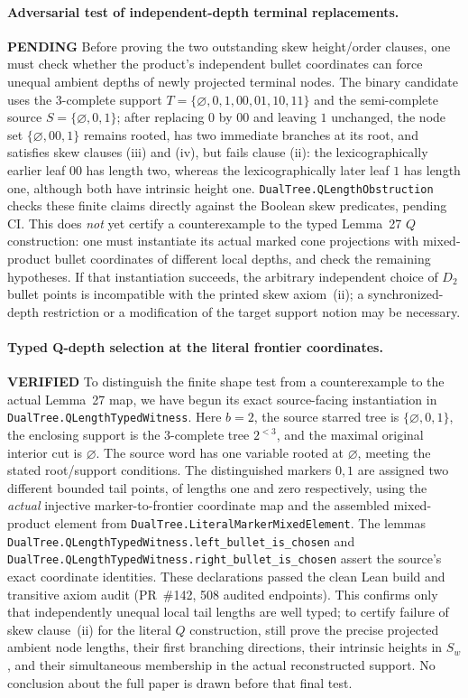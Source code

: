 \documentclass[11pt]{article}
\newcommand{\ok}{\textcolor{green!40!black}{\textbf{VERIFIED}}}
\newcommand{\todo}{\textcolor{gray!70!black}{\textbf{PENDING}}}
\newcommand{\lean}[1]{\texttt{#1}}
\begin{document}
\paragraph{Adversarial test of independent-depth terminal replacements.} \todo
Before proving the two outstanding skew height/order clauses,
one must check whether the product's independent bullet coordinates
can force unequal ambient depths of newly projected terminal nodes.
The binary candidate uses the 3-complete support
$T=\{\varnothing,0,1,00,01,10,11\}$ and the semi-complete source
$S=\{\varnothing,0,1\}$; after replacing $0$ by $00$ and leaving
$1$ unchanged, the node set $\{\varnothing,00,1\}$ remains rooted,
has two immediate branches at its root, and satisfies skew clauses
(iii) and (iv), but fails clause (ii):
the lexicographically earlier leaf $00$ has length two, whereas
the lexicographically later leaf $1$ has length one, although
both have intrinsic height one.
\lean{DualTree.QLengthObstruction} checks these finite claims
directly against the Boolean skew predicates, pending CI.
This does \emph{not} yet certify a counterexample to the typed
Lemma~27 $Q$ construction: one must instantiate its actual marked
cone projections with mixed-product bullet coordinates of
different local depths, and check the remaining hypotheses.
If that instantiation succeeds, the arbitrary independent choice
of $D_2$ bullet points is incompatible with the printed skew
axiom~(ii); a synchronized-depth restriction or a modification
of the target support notion may be necessary.

\paragraph{Typed Q-depth selection at the literal frontier coordinates.} \ok
To distinguish the finite shape test from a counterexample to
the actual Lemma~27 map, we have begun its exact source-facing
instantiation in \lean{DualTree.QLengthTypedWitness}.
Here $b=2$, the source starred tree is
$\{\varnothing,0,1\}$, the enclosing support is the
$3$-complete tree $2^{<3}$, and the maximal original
interior cut is $\varnothing$.  The source word has one
variable rooted at $\varnothing$, meeting the stated
root/support conditions.  The distinguished markers $0,1$
are assigned two different bounded tail points, of lengths
one and zero respectively, using the \emph{actual} injective
marker-to-frontier coordinate map and the assembled mixed-product
element from \lean{DualTree.LiteralMarkerMixedElement}.
The lemmas \lean{DualTree.QLengthTypedWitness.left_bullet_is_chosen}
and \lean{DualTree.QLengthTypedWitness.right_bullet_is_chosen}
assert the source's exact coordinate identities.
These declarations passed the clean Lean build and transitive axiom audit
(PR~\#142, 508 audited endpoints).
This confirms only that independently unequal local tail lengths
are well typed; to certify failure of skew clause~(ii) for the
literal $Q$ construction, still prove the precise projected
ambient node lengths, their first branching directions, their
intrinsic heights in $S_w$, and their simultaneous membership
in the actual reconstructed support. No conclusion about the
full paper is drawn before that final test.
\end{document}
